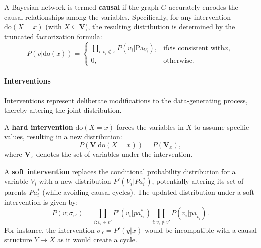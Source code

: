 \begin{remark}
	A Bayesian network is termed \textbf{causal} if the graph \(G\) accurately encodes the causal relationships among the variables. Specifically, for any intervention \(\text{do}(X = x)\) (with \(X \subseteq \mathbf{V}\)), the resulting distribution is determined by the truncated factorization formula:
	\begin{equation}
		P(v|\text{do}(x)) =
		\begin{cases}
			\prod_{i: v_i \notin x} P(v_i|\text{Pa}_{V_i}), & \text{if} v \text{is consistent with} x, \\
			0,                                              & \text{otherwise}.
		\end{cases}
	\end{equation}
\end{remark}

\paragraph{Interventions}

Interventions represent deliberate modifications to the data-generating process, thereby altering the joint distribution.

\begin{definition}
	A \textbf{hard intervention} \(\text{do}(X = x)\) forces the variables in \(X\) to assume specific values, resulting in a new distribution:
	\begin{equation}
		P(\mathbf{V}|\text{do}(X = x)) = P(\mathbf{V}_x),
	\end{equation}
	where \(\mathbf{V}_x\) denotes the set of variables under the intervention.
\end{definition}

\begin{definition}
	A \textbf{soft intervention} replaces the conditional probability distribution for a variable \(V_i\) with a new distribution \(P'(V_i|Pa^*_i)\), potentially altering its set of parents \(Pa^*_i\) (while avoiding causal cycles). The updated distribution under a soft intervention is given by:
	\begin{equation}
		P(v; \sigma_{v'}) = \prod_{i: v_i \in v'} P'(v_i|pa^*_{v_i}) \prod_{i: v_i \notin v'} P(v_i|\text{pa}_{v_i}).
	\end{equation}
	For instance, the intervention \(\sigma_Y = P'(y|x)\) would be incompatible with a causal structure \(Y \to X\) as it would create a cycle.
\end{definition}

